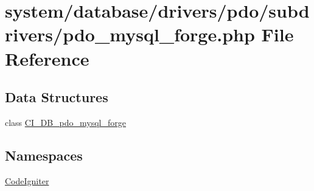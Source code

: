 \hypertarget{pdo__mysql__forge_8php}{}\section{system/database/drivers/pdo/subdrivers/pdo\+\_\+mysql\+\_\+forge.php File Reference}
\label{pdo__mysql__forge_8php}
\subsection*{Data Structures}
\begin{DoxyCompactItemize}
\item 
class \mbox{\hyperlink{class_c_i___d_b__pdo__mysql__forge}{C\+I\+\_\+\+D\+B\+\_\+pdo\+\_\+mysql\+\_\+forge}}
\end{DoxyCompactItemize}
\subsection*{Namespaces}
\begin{DoxyCompactItemize}
\item 
 \mbox{\hyperlink{namespace_code_igniter}{Code\+Igniter}}
\end{DoxyCompactItemize}
